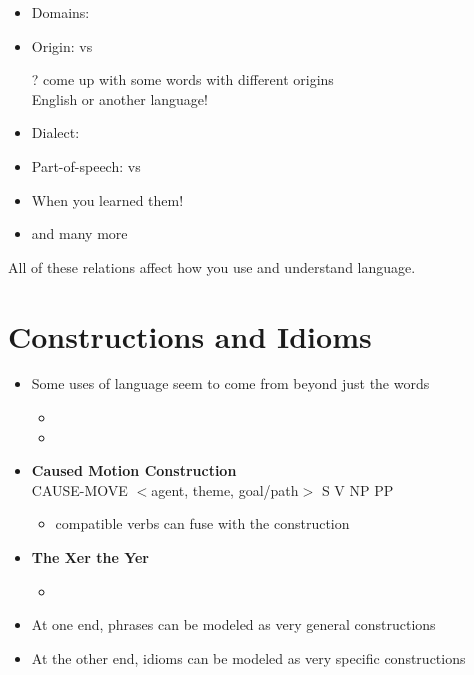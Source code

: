 \documentclass[a4paper,landscape,headrule,footrule,xetex]{foils}
\begin{document}


\begin{itemize}
\item Domains: 
\item Origin:  vs 
\item[?] come up with some words with different origins\task 
  \\ English or another language!
\item Dialect: 
\item Part-of-speech:  vs 
\item When you learned them!
\item and many more
\end{itemize}

All of these relations affect how you use and understand language.
  
\section{Constructions and Idioms}


\begin{itemize}
\item Some uses of language seem to come from beyond just the words
  \begin{itemize}
  \item {}
  \item {}
  \end{itemize}
\item \textbf{Caused Motion Construction}
  \\ CAUSE-MOVE $<$agent, theme, goal/path$>$ \into S V NP PP
  \begin{itemize}
  \item compatible verbs can fuse with the construction
  \end{itemize}
\item \textbf{The Xer the Yer}
  \begin{itemize}
  \item {}
  \end{itemize}
\item At one end, phrases can be modeled as very general constructions
\item At the other end, idioms can be modeled as very specific constructions
\end{itemize}
\end{document}
